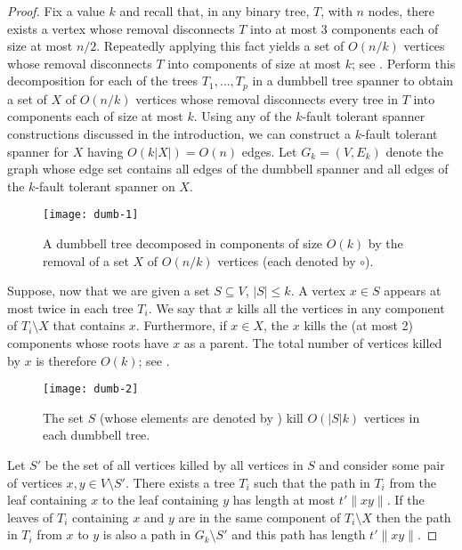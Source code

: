 \documentclass{patmorin}
\begin{document}
\begin{proof} 

Fix a value $k$ and recall that, in any binary tree, $T$, with $n$
nodes, there exists a vertex whose removal disconnects $T$ into at most 3
components each of size at most $n/2$.  Repeatedly applying this
fact yields a set of $O(n/k)$ vertices whose removal disconnects $T$ into
components of size at most $k$; see .  Perform this decomposition for each of
the trees $T_1,\ldots,T_p$ in a dumbbell tree spanner to obtain a set of
$X$ of $O(n/k)$ vertices whose removal disconnects every tree in $T$ into
components each of size at most $k$.  Using any of the $k$-fault tolerant
spanner constructions discussed in the introduction, we can construct
a $k$-fault tolerant spanner for $X$ having $O(k|X|)=O(n)$ edges.
Let $G_k=(V,E_k)$ denote the graph whose edge set contains all edges of the
dumbbell spanner and all edges of the $k$-fault tolerant spanner on $X$.

\begin{figure}
\begin{center}
  \texttt{[image: dumb-1]}
\end{center}
\caption{A dumbbell tree decomposed in components of size $O(k)$ by the
removal of a set $X$ of $O(n/k)$ vertices (each denoted by $\circ$).}
\end{figure}

Suppose, now that we are given a set $S\subseteq V$, $|S|\le k$.  A vertex
$x\in S$ appears at most twice in each tree $T_i$.  We say that $x$ kills
all the vertices in any component of $T_i\setminus X$ that contains $x$.
Furthermore, if $x\in X$, the $x$ kills the (at most 2) components whose
roots have $x$ as a parent.  The total number of vertices killed by $x$
is therefore $O(k)$; see .

\begin{figure}
\begin{center}
  \texttt{[image: dumb-2]}
\end{center}
\caption{The set $S$ (whose elements are denoted by \textbullet) kill
$O(|S|k)$ vertices in each dumbbell tree.}
\end{figure}

Let $S'$ be the set of all vertices killed by all vertices in $S$ and
consider some pair of vertices $x,y\in V\setminus S'$.  There exists a
tree $T_i$ such that the path in $T_i$ from the leaf containing $x$ to the
leaf containing $y$ has length at most $t'\|xy\|$.  If the leaves of $T_i$
containing $x$ and $y$ are in the same component of $T_i\setminus X$ then
the path in $T_i$ from $x$ to $y$ is also a path in $G_k\setminus S'$ and
this path has length $t'\|xy\|$.


\end{proof}
\end{document}
